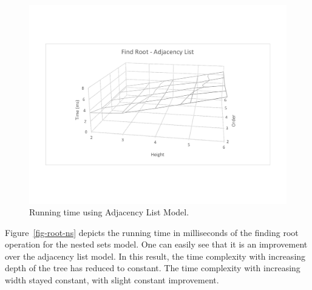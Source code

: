 \begin{figure}[h]
\begin{center}
\includegraphics[width=6in]{images/root-al-wire.pdf}
\caption{Running time using Adjacency List Model.\label{fig-root-al}}
\end{center}
\end{figure}

Figure~\ref{fig-root-ns} depicts the running time in milliseconds of the finding root operation for the nested sets model. One can easily see that it is an improvement over the adjacency list model. In this result, the time complexity with increasing depth of the tree has reduced to constant. The time complexity with increasing width stayed constant, with slight constant improvement.

